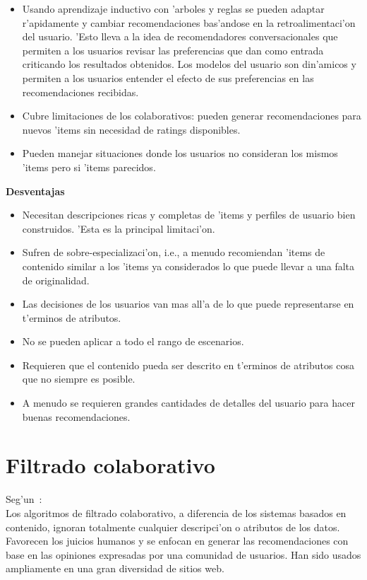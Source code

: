 \documentclass[11pt]{article}
\begin{document}
\begin{itemize}
\item  Usando aprendizaje inductivo con 'arboles y reglas se pueden adaptar r'apidamente y cambiar recomendaciones bas'andose en la retroalimentaci'on del usuario. 'Esto lleva a la idea de recomendadores conversacionales que permiten a los usuarios revisar las preferencias que dan como entrada criticando los resultados obtenidos. Los modelos del usuario son din'amicos y permiten a los usuarios entender el efecto de sus preferencias en las recomendaciones recibidas.
\item Cubre limitaciones de los colaborativos: pueden generar recomendaciones para nuevos 'items sin necesidad de ratings disponibles.
\item Pueden manejar situaciones donde los usuarios no consideran los mismos 'items pero si 'items parecidos.
\end{itemize}

\medskip
\noindent
\textbf{Desventajas}

\begin{itemize}
\item Necesitan descripciones ricas y completas de 'items y perfiles de usuario bien construidos. 'Esta es la principal limitaci'on.
\item Sufren de sobre-especializaci'on, i.e., a menudo recomiendan 'items de contenido similar a los 'items ya considerados lo que puede llevar a una falta de originalidad.
\item Las decisiones de los usuarios van mas all'a de lo que puede representarse en t'erminos de atributos.
\item No se pueden aplicar a todo el rango de escenarios.
\item Requieren que el contenido pueda ser descrito en t'erminos de atributos cosa que no siempre es posible.
\item A menudo se requieren grandes cantidades de detalles del usuario para hacer buenas recomendaciones.
\end{itemize}


\section{Filtrado colaborativo}
Seg'un~\cite{recsys:nlathia}:\\
Los algoritmos de filtrado colaborativo, a diferencia de los sistemas basados en contenido, ignoran totalmente cualquier descripci'on o atributos de los datos. Favorecen los juicios humanos y se enfocan en generar las recomendaciones con base en las opiniones expresadas por una comunidad de usuarios. Han sido usados ampliamente en una gran diversidad de sitios web.
\end{document}
